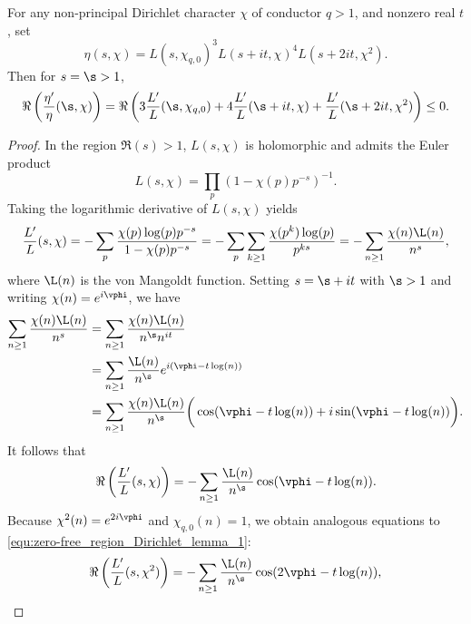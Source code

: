       \begin{lemma}\label{lem:zero-free_region_Dirichlet_lemma}
        For any non-principal Dirichlet character $\chi$ of conductor $q > 1$, and nonzero real $t$, set
        \[
          \eta(s,\chi) = L(s,\chi_{q,0})^{3}L(s+it,\chi)^{4}L(s+2it,\chi^{2}).
        \]
        Then for $s = \s > 1$,
        \[
          \Re\left(\frac{\eta'}{\eta}(\s,\chi)\right) = \Re\left(3\frac{L'}{L}(\s,\chi_{q,0})+4\frac{L'}{L}(\s+it,\chi)+\frac{L'}{L}(\s+2it,\chi^{2})\right) \le 0.
        \]
      \end{lemma}
      \begin{proof}
        In the region $\Re(s) > 1$, $L(s,\chi)$ is holomorphic and admits the Euler product
        \[
          L(s,\chi) = \prod_{p}(1-\chi(p)p^{-s})^{-1}.
        \]
        Taking the logarithmic derivative of $L(s,\chi)$ yields
        \begin{equation}\label{equ:Drichlet_series_log_derivative_Dirichlet}
          \frac{L'}{L}(s,\chi) = -\sum_{p}\frac{\chi(p)\log(p)p^{-s}}{1-\chi(p)p^{-s}} = -\sum_{p}\sum_{k \ge 1}\frac{\chi(p^{k})\log(p)}{p^{ks}} = -\sum_{n \ge 1}\frac{\chi(n)\L(n)}{n^{s}},
        \end{equation}
        where $\L(n)$ is the von Mangoldt function. Setting $s = \s+it$ with $\s > 1$ and writing $\chi(n) = e^{i\vphi}$, we have
        \begin{align*}
          \sum_{n \ge 1}\frac{\chi(n)\L(n)}{n^{s}} &= \sum_{n \ge 1}\frac{\chi(n)\L(n)}{n^{\s}n^{it}} \\
          &= \sum_{n \ge 1}\frac{\L(n)}{n^{\s}}e^{i(\vphi-t\log(n))} \\
          &= \sum_{n \ge 1}\frac{\chi(n)\L(n)}{n^{\s}}\bigg(\cos(\vphi-t\log(n))+i\sin(\vphi-t\log(n))\bigg).
        \end{align*}
        It follows that
        \begin{equation}\label{equ:zero-free_region_Dirichlet_lemma_1}
          \Re\left(\frac{L'}{L}(s,\chi)\right) = -\sum_{n \ge 1}\frac{\L(n)}{n^{\s}}\cos(\vphi-t\log(n)).
        \end{equation}
        Because $\chi^{2}(n) = e^{2i\vphi}$ and $\chi_{q,0}(n) = 1$, we obtain analogous equations to \cref{equ:zero-free_region_Dirichlet_lemma_1}:
        \begin{equation}\label{equ:zero-free_region_Dirichlet_lemma_2}
          \Re\left(\frac{L'}{L}(s,\chi^{2})\right) = -\sum_{n \ge 1}\frac{\L(n)}{n^{\s}}\cos(2\vphi-t\log(n)),
        \end{equation}

\end{proof}
